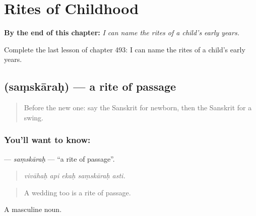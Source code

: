 
\chapter{Rites of Childhood}
\label{ch:sa-rites-of-childhood}

\begin{chapteropening}
\textbf{By the end of this chapter:} \emph{I can name the rites of a child's early years.}

Complete the last lesson of chapter 493: I can name the rites of a child's early years.
\end{chapteropening}

\section[\texorpdfstring{\sk{संस्कारः} (saṃskāraḥ)}{संस्कारः (saṃskāraḥ)}]{ (saṃskāraḥ) — a rite of passage}

\label{lesson:SA-C493-samskarah}



\begin{quote}
Before the new one: say the Sanskrit for newborn, then the Sanskrit for a swing.
\end{quote}

\subsection*{You'll want to know: }
\textbf{} — \emph{saṃskāraḥ} — \textquotedblleft{}a rite of passage\textquotedblright{}.

\begin{quote}
    
\end{quote}

\begin{quote}
\emph{vivāhaḥ api ekaḥ saṃskāraḥ asti.}
\end{quote}

\begin{quote}
A wedding too is a rite of passage.
\end{quote}

A masculine noun.

